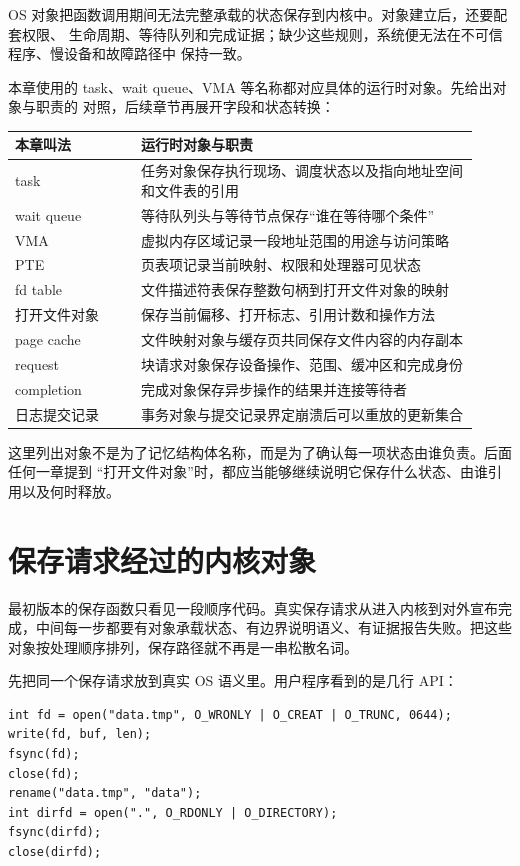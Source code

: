 OS 对象把函数调用期间无法完整承载的状态保存到内核中。对象建立后，还要配套权限、
生命周期、等待队列和完成证据；缺少这些规则，系统便无法在不可信程序、慢设备和故障路径中
保持一致。

本章使用的 task、wait queue、VMA 等名称都对应具体的运行时对象。先给出对象与职责的
对照，后续章节再展开字段和状态转换：

\begin{longtable}{|L{0.25\linewidth}|L{0.67\linewidth}|}
\toprule
本章叫法 & 运行时对象与职责 \\
\midrule
task & 任务对象保存执行现场、调度状态以及指向地址空间和文件表的引用 \\\tablerowrule
wait queue & 等待队列头与等待节点保存“谁在等待哪个条件” \\\tablerowrule
VMA & 虚拟内存区域记录一段地址范围的用途与访问策略 \\\tablerowrule
PTE & 页表项记录当前映射、权限和处理器可见状态 \\\tablerowrule
fd table & 文件描述符表保存整数句柄到打开文件对象的映射 \\\tablerowrule
打开文件对象 & 保存当前偏移、打开标志、引用计数和操作方法 \\\tablerowrule
page cache & 文件映射对象与缓存页共同保存文件内容的内存副本 \\\tablerowrule
request & 块请求对象保存设备操作、范围、缓冲区和完成身份 \\\tablerowrule
completion & 完成对象保存异步操作的结果并连接等待者 \\\tablerowrule
日志提交记录 & 事务对象与提交记录界定崩溃后可以重放的更新集合 \\
\bottomrule
\end{longtable}

这里列出对象不是为了记忆结构体名称，而是为了确认每一项状态由谁负责。后面任何一章提到
“打开文件对象”时，都应当能够继续说明它保存什么状态、由谁引用以及何时释放。

\section{保存请求经过的内核对象}

最初版本的保存函数只看见一段顺序代码。真实保存请求从进入内核到对外宣布完成，中间每一步都要有对象承载状态、有边界说明语义、有证据报告失败。把这些对象按处理顺序排列，保存路径就不再是一串松散名词。

先把同一个保存请求放到真实 OS 语义里。用户程序看到的是几行 API：

\begin{lstlisting}
int fd = open("data.tmp", O_WRONLY | O_CREAT | O_TRUNC, 0644);
write(fd, buf, len);
fsync(fd);
close(fd);
rename("data.tmp", "data");
int dirfd = open(".", O_RDONLY | O_DIRECTORY);
fsync(dirfd);
close(dirfd);
\end{lstlisting}

